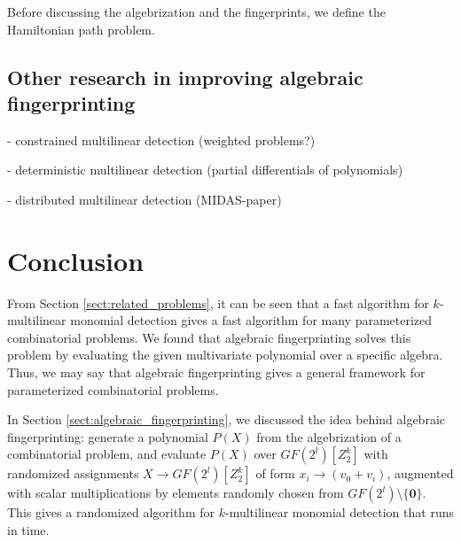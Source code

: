 Before discussing the algebrization and the fingerprints, 
we define the Hamiltonian path problem.

\begin{problem}
\end{problem}


\subsection{Other research in improving algebraic fingerprinting}
\label{sect:other_improvements}

- constrained multilinear detection (weighted problems?)

- deterministic multilinear detection (partial differentials of polynomials)

- distributed multilinear detection (MIDAS-paper)

\section{Conclusion}
\label{sect:conclusion}

From Section \ref{sect:related_problems}, 
it can be seen  
that a fast algorithm for $k$-multilinear monomial detection gives a 
fast algorithm for many parameterized combinatorial problems. 
We found that algebraic fingerprinting solves this problem by 
evaluating the given multivariate polynomial over a specific algebra. 
Thus, we 
may say that algebraic fingerprinting gives a general framework for 
parameterized combinatorial problems. 

In Section \ref{sect:algebraic_fingerprinting}, we discussed the idea behind 
algebraic fingerprinting: generate a polynomial $P(X)$ from the algebrization of 
a combinatorial problem, and evaluate $P(X)$ over $GF(2^{l})[Z_2^k]$ with 
randomized assignments $X \to GF(2^{l})[Z_2^k]$ of form 
$x_i \to (v_0 + v_i)$, augmented with scalar multiplications 
by elements randomly chosen from $GF(2^{l}) \setminus \{\mathbf{0}\}$. 
This gives a 
randomized algorithm for $k$-multilinear monomial detection that runs in  time.

